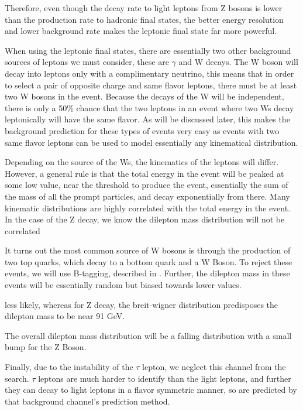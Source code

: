       Therefore, even though the decay rate to light leptons from Z bosons is lower than the production rate to hadronic final states, the better energy resolution and lower background rate makes the leptonic final state far more powerful.

      When using the leptonic final states, there are essentially two other background sources of leptons we must consider, these are $\gamma$ and W decays. The W boson will decay into leptons only with a complimentary neutrino, this means that in order to select a pair of opposite charge and same flavor leptons, there must be at least two W bosons in the event. Because the decays of the W will be independent, there is only a 50\% chance that the two leptons in an event where two Ws decay leptonically will have the same flavor. As will be discussed later, this makes the background prediction for these types of events very easy as events with two same flavor leptons can be used to model essentially any kinematical distribution.

      Depending on the source of the Ws, the kinematics of the leptons will differ. However, a general rule is that the total energy in the event will be peaked at some low value, near the threshold to produce the event, essentially the sum of the mass of all the prompt particles, and decay exponentially from there. Many kinematic distributions are highly correlated with the total energy in the event. In the case of the Z decay, we know the dilepton mass distribution will not be correlated

      It turns out the most common source of W bosons is through the production of two top quarks, which decay to a bottom quark and a W Boson. To reject these events, we will use B-tagging, described in . Further, the dilepton mass in these events will be essentially random  but biased towards lower values. 

      less likely, whereas for Z decay, the breit-wigner distribution predisposes the dilepton mass to be near 91 GeV. 

      The overall dilepton mass distribution will be a falling distribution with a small bump for the Z Boson. 


      Finally, due to the instability of the $\tau$ lepton, we neglect this channel from the search. $\tau$ leptons are much harder to identify than the light leptons, and further they can decay to light leptons in a flavor symmetric manner, so are predicted by that background channel's prediction method.

